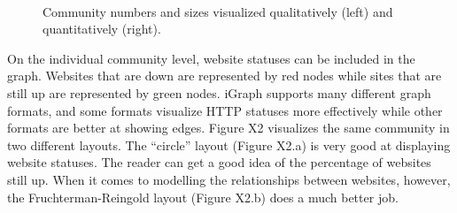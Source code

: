 \documentclass[conference]{IEEEtran}
\begin{document}
\begin{figure}[htbp]
    \centering
    \\
    \caption{Community numbers and sizes visualized qualitatively (left) and quantitatively (right).}
    \label{fig}
\end{figure}

On the individual community level, website statuses can be included in the graph. Websites that are down are represented by red nodes while sites that are still up are represented by green nodes. iGraph supports many different graph formats, and some formats visualize HTTP statuses more effectively while other formats are better at showing edges. Figure X2 visualizes the same community in two different layouts. The “circle” layout (Figure X2.a) is very good at displaying website statuses. The reader can get a good idea of the percentage of websites still up. When it comes to modelling the relationships between websites, however, the Fruchterman-Reingold layout (Figure X2.b) does a much better job.
\end{document}
